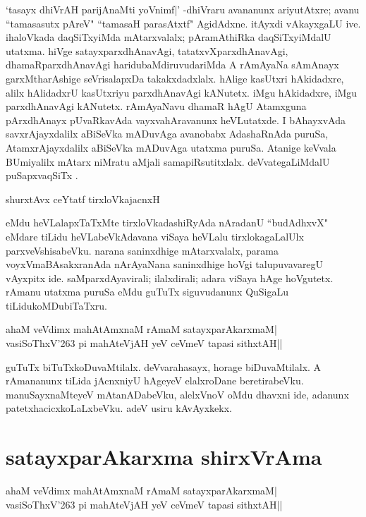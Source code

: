 `tasayx dhiVrAH parijAnaMti yoVnimf|' -dhiVraru avananunx ariyutAtxre; avanu ``tamasasutx pAreV" ``tamasaH parasAtxtf"\label{251} AgidAdxne. itAyxdi vAkayxgaLU ive. ihaloVkada daqSiTxyiMda mAtarxvalalx; pAramAthiRka daqSiTxyiMdalU utatxma. hiVge satayxparxdhAnavAgi, tatatxvXparxdhAnavAgi, dhamaRparxdhAnavAgi haridubaMdiruvudariMda A rAmAyaNa sAmAnayx garxMtharAshige seVrisalapxDa takakxdadxlalx. hAlige kasUtxri hAkidadxre, alilx hAlidadxrU kasUtxriyu parxdhAnavAgi kANutetx. iMgu hAkidadxre, iMgu parxdhAnavAgi kANutetx. rAmAyaNavu dhamaR hAgU Atamxguna pArxdhAnayx pUvaRkavAda vayxvahAravanunx heVLutatxde. I bAhayxvAda savxrAjayxdalilx aBiSeVka mADuvAga avanobabx AdashaRnAda puruSa, AtamxrAjayxdalilx aBiSeVka mADuvAga utatxma puruSa. Atanige keVvala BUmiyalilx mAtarx niMratu aMjali samapiRsutitxlalx. deVvategaLiMdalU puSapxvaqSiTx .

\begin{shloka}
shurxtAvx ceYtatf tirxloVkajacnxH\label{251b}
\end{shloka}
eMdu heVLalapxTaTxMte tirxloVkadashiRyAda nAradanU ``budAdhxvX" eMdare tiLidu heVLabeVkAdavana viSaya heVLalu tirxlokagaLalUlx parxveVshisabeVku. narana saninxdhige mAtarxvalalx, parama voyxVmaBAsakxranAda nArAyaNana saninxdhige hoVgi talupuvavaregU vAyxpitx ide. saMparxdAyavirali; ilalxdirali; adara viSaya hAge hoVgutetx. rAmanu utatxma puruSa eMdu guTuTx siguvudanunx QuSigaLu tiLidukoMDubiTaTxru.

\begin{shloka}
ahaM veVdimx mahAtAmxnaM rAmaM satayxparAkarxmaM|\label{251a}\\
vasiSoThxV\char'263 pi mahAteVjAH yeV ceVmeV tapasi sithxtAH||
\end{shloka}

guTuTx biTuTxkoDuvaMtilalx. deVvarahasayx, horage biDuvaMtilalx. A rAmananunx tiLida jAcnxniyU hAgeyeV elalxroDane beretirabeVku. manuSayxnaMteyeV mAtanADabeVku, alelxVnoV oMdu dhavxni ide, adanunx patetxhacicxkoLaLxbeVku. adeV usiru kAvAyxkekx. 

\section*{satayxparAkarxma shirxVrAma}

\begin{shloka}
ahaM veVdimx mahAtAmxnaM rAmaM satayxparAkarxmaM|\\
vasiSoThxV\char'263 pi mahAteVjAH yeV ceVmeV tapasi sithxtAH||
\end{shloka}

